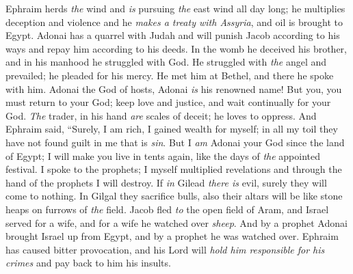 \begin{biblechapter} %
\verse Ephraim herds \textit{the} wind 
and \textit{is} pursuing \textit{the} east wind all day long; 
he multiplies deception and violence 
and he \textit{makes a treaty with Assyria}, 
and oil is brought to Egypt.
\verse Adonai has a quarrel with Judah 
and will punish Jacob according to his ways 
and repay him according to his deeds.
\verse In the womb he deceived his brother, 
and in his manhood he struggled with God.
\verse He struggled with \textit{the} angel and prevailed; 
he pleaded for his mercy. 
He met him at Bethel, 
and there he spoke with him.
\verse Adonai the God of hosts, 
Adonai \textit{is} his renowned name!
\verse But you, you must return to your God; 
keep love and justice, 
and wait continually for your God.
\verse \textit{The} trader, in his hand \textit{are} scales of deceit; 
he loves to oppress.
\verse And Ephraim said, “Surely, I am rich, 
I gained wealth for myself; 
in all my toil they have not found guilt in me 
that is \textit{sin}.
\verse But I \textit{am} Adonai your God 
since the land of Egypt; 
I will make you live in tents again, 
like the days of \textit{the} appointed festival.
\verse I spoke to the prophets; 
I myself multiplied revelations 
and through the hand of the prophets I will destroy.
\verse If \textit{in} Gilead \textit{there is} evil, 
surely they will come to nothing. 
In Gilgal they sacrifice bulls, 
also their altars will be like stone heaps 
on furrows of \textit{the} field.
\verse Jacob fled \textit{to} the open field of Aram, 
and Israel served for a wife, 
and for a wife he watched over \textit{sheep}.
\verse And by a prophet Adonai brought 
Israel up from Egypt, 
and by a prophet 
he was watched over.
\verse Ephraim has caused bitter provocation, 
and his Lord will \textit{hold him responsible for his crimes} 
and pay back to him his insults.
\end{biblechapter}

